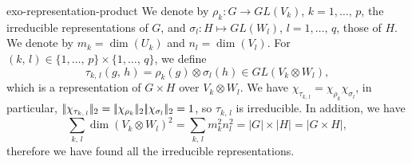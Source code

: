  
\begin{correction}{exo-representation-product}
 We denote by $ \rho_k: G \rightarrow GL (V_k) $, $ k = 1, \ldots, \, p $, the irreducible representations of $ G $, and $ \sigma_l: H \mapsto GL (W_l) $, $ l = 1, \ldots, \, q $, those of $ H $. We denote by $ m_k = \dim (U_k) $ and $ n_l = \dim (V_l) $. For $ (k, \, l) \in \{1, \ldots, \, p\} \times \{1, \ldots, \, q\} $, we define
\begin{equation*}
\tau_{k, \, l} (g, \, h) = \rho_k (g) \otimes \sigma_l (h) \in GL (V_k \otimes W_l),
\end{equation*}
which is a representation of $ G \times H $ over $ V_k \otimes W_l $. We have $ \chi_{\tau_{k, \, l}} = \chi_{\rho_k} \chi_{\sigma_l} $, in particular, $ |\!| \chi_{\tau_{k, \, l}} |\!|_2 = |\!| \chi_{\rho_k} |\!|_2 |\!| \chi_{\sigma_l} |\!|_2 = 1 $, so $ \tau_{k, \, l} $ is irreducible. In addition, we have
\begin{equation*}
\sum_{k, \, l}{\dim (V_k \otimes W_l)^2} = \sum_{k, \, l}{m_k^2 n_l^2} = |G| \times | H | = | G \times H |,
\end{equation*}
therefore we have found all the irreducible representations.
\end{correction}
 
